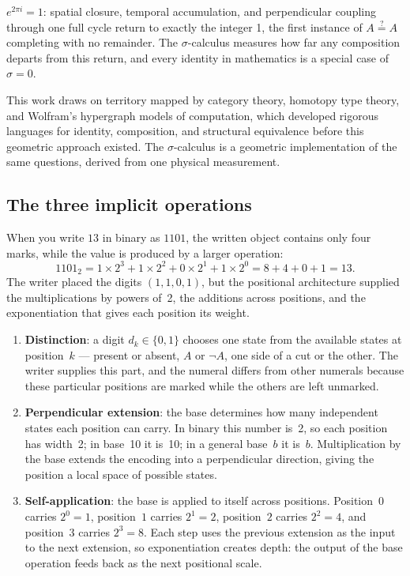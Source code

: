 \documentclass[12pt]{article}
\begin{document}
$e^{2\pi i} = 1$: spatial closure, temporal accumulation, and perpendicular coupling through one full cycle return to exactly the integer 1, the first instance of $A \stackrel{?}{=} A$ completing with no remainder. The $\sigma$-calculus measures how far any composition departs from this return, and every identity in mathematics is a special case of $\sigma = 0$.

This work draws on territory mapped by category theory, homotopy type theory, and Wolfram's hypergraph models of computation, which developed rigorous languages for identity, composition, and structural equivalence before this geometric approach existed. The $\sigma$-calculus is a geometric implementation of the same questions, derived from one physical measurement.

\subsection{The three implicit operations}

When you write $13$ in binary as $1101$, the written object contains only four marks, while the value is produced by a larger operation:
\begin{equation}
    1101_2
    =
    1 \times 2^3
    + 1 \times 2^2
    + 0 \times 2^1
    + 1 \times 2^0
    =
    8 + 4 + 0 + 1
    =
    13.
\end{equation}
The writer placed the digits $(1,1,0,1)$, but the positional architecture supplied the multiplications by powers of~2, the additions across positions, and the exponentiation that gives each position its weight.

\begin{enumerate}
    \item \textbf{Distinction}: a digit $d_k \in \{0,1\}$ chooses one state from the available states at position~$k$ --- present or absent, $A$ or $\lnot A$, one side of a cut or the other. The writer supplies this part, and the numeral differs from other numerals because these particular positions are marked while the others are left unmarked.

    \item \textbf{Perpendicular extension}: the base determines how many independent states each position can carry. In binary this number is~2, so each position has width~2; in base~10 it is~10; in a general base~$b$ it is~$b$. Multiplication by the base extends the encoding into a perpendicular direction, giving the position a local space of possible states.

    \item \textbf{Self-application}: the base is applied to itself across positions. Position~$0$ carries $2^0=1$, position~$1$ carries $2^1=2$, position~$2$ carries $2^2=4$, and position~$3$ carries $2^3=8$. Each step uses the previous extension as the input to the next extension, so exponentiation creates depth: the output of the base operation feeds back as the next positional scale.
\end{enumerate}
\end{document}
